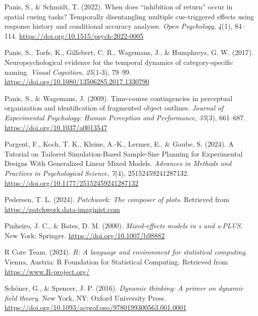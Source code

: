 \documentclass[
  man, donotrepeattitle,floatsintext]{apa6}
\newlength{\cslhangindent}
\newenvironment{CSLReferences}[2] %
 {\begin{list}{}{%
  \setlength{\itemindent}{0pt}
  \setlength{\leftmargin}{0pt}
  \setlength{\parsep}{0pt}
  \ifodd #1
   \setlength{\leftmargin}{\cslhangindent}
   \setlength{\itemindent}{-1\cslhangindent}
  \fi
  \setlength{\itemsep}{#2\baselineskip}}}
 {\end{list}}
\begin{document}
\begin{CSLReferences}{1}{0}
Panis, S., \& Schmidt, T. (2022). When does {``inhibition of return''} occur in spatial cueing tasks? {Temporally} disentangling multiple cue-triggered effects using response history and conditional accuracy analyses. \emph{Open Psychology}, \emph{4}(1), 84--114. \url{https://doi.org/10.1515/psych-2022-0005}

Panis, S., Torfs, K., Gillebert, C. R., Wagemans, J., \& Humphreys, G. W. (2017). Neuropsychological evidence for the temporal dynamics of category-specific naming. \emph{Visual Cognition}, \emph{25}(1-3), 79--99. \url{https://doi.org/10.1080/13506285.2017.1330790}

Panis, S., \& Wagemans, J. (2009). Time-course contingencies in perceptual organization and identification of fragmented object outlines. \emph{Journal of Experimental Psychology: Human Perception and Performance}, \emph{35}(3), 661--687. \url{https://doi.org/10.1037/a0013547}

Pargent, F., Koch, T. K., Kleine, A.-K., Lermer, E., \& Gaube, S. (2024). A {Tutorial} on {Tailored Simulation-Based Sample-Size Planning} for {Experimental Designs With Generalized Linear Mixed Models}. \emph{Advances in Methods and Practices in Psychological Science}, \emph{7}(4), 25152459241287132. \url{https://doi.org/10.1177/25152459241287132}

Pedersen, T. L. (2024). \emph{Patchwork: The composer of plots}. Retrieved from \url{https://patchwork.data-imaginist.com}

Pinheiro, J. C., \& Bates, D. M. (2000). \emph{Mixed-effects models in s and s-PLUS}. New York: Springer. \url{https://doi.org/10.1007/b98882}

R Core Team. (2024). \emph{R: A language and environment for statistical computing}. Vienna, Austria: R Foundation for Statistical Computing. Retrieved from \url{https://www.R-project.org/}

Schöner, G., \& Spencer, J. P. (2016). \emph{Dynamic thinking: A primer on dynamic field theory}. New York, NY: Oxford University Press. \url{https://doi.org/10.1093/acprof:oso/9780199300563.001.0001}


\end{CSLReferences}
\end{document}
